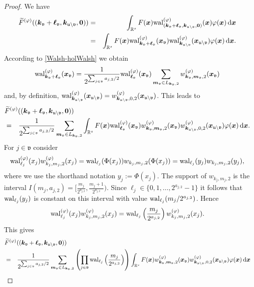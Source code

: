 \documentclass[namedate,webpdf,imanum]{ima-authoring-arxiv}%
\theoremstyle{thmstyletwo}%
\numberwithin{equation}{section}
\newcommand{\rd}{\, {\rm d}}
\newcommand{\wal}{{\rm wal}}
\newcommand{\bsx}{\boldsymbol{x}}
\newcommand{\bsk}{\boldsymbol{k}}
\newcommand{\bsm}{\boldsymbol{m}}
\newcommand{\bsell}{\boldsymbol{\ell}}
\newcommand{\bszero}{\boldsymbol{0}}
\newcommand{\uu}{\mathfrak{u}}
\newcommand{\vv}{\mathfrak{v}}
\newcommand{\RR}{\mathbb{R}}
\begin{document}
\begin{proof}
We have 
\begin{eqnarray*}
\widetilde{F}^{(\varphi)}((\bsk_\vv+\bsell_\vv,\bsk_{\uu \setminus \vv},\bszero))  & = & \int_{\RR^s} F(\bsx) \wal_{(\bsk_\vv+\bsell_\vv,\bsk_{\uu \setminus \vv},\bszero)}^{(\varphi)}(\bsx) \varphi(\bsx) \rd \bsx  \\
& = & \int_{\RR^s} F(\bsx) \wal_{\bsk_\vv+\bsell_\vv}^{(\varphi)}(\bsx_\vv) \wal_{\bsk_{\uu \setminus \vv}}^{(\varphi)}(\bsx_{\uu \setminus \vv}) \varphi(\bsx) \rd \bsx. 
\end{eqnarray*}
According to \eqref{Walsh-holWalsh} we obtain $$\wal_{\bsk_\vv+\bsell_\vv}^{(\varphi)}(\bsx_\vv) = \frac{1}{2^{\sum_{j \in \vv} a_{j,2}/2}} \wal_{\bsell_{\vv}}^{(\varphi)}(\bsx_\vv) \sum_{\bsm_{\vv} \in L_{\bsk_{\vv}, 2}} w_{\bsk_\vv,\bsm_\vv,2}^{(\varphi)}(\bsx_\vv)$$
and, by definition, $\wal_{\bsk_{\uu \setminus \vv}}^{(\varphi)}(\bsx_{\uu \setminus \vv})=w^{(\varphi)}_{\bsk_{\uu \setminus \vv},0,2}(\bsx_{\uu \setminus \vv})$. 
This leads to
\begin{eqnarray*}
\lefteqn{\widetilde{F}^{(\varphi)}((\bsk_\vv+\bsell_\vv,\bsk_{\uu \setminus \vv},\bszero))}\\
& = & \frac{1}{2^{\sum_{j \in \vv} a_{j,2}/2}}  \sum_{\bsm_{\vv} \in L_{\bsk_{\vv}, 2}} \int_{\RR^s} F(\bsx) \wal_{\bsell_{\vv}}^{(\varphi)}(\bsx_\vv) w_{\bsk_\vv,\bsm_\vv,2}^{(\varphi)}(\bsx_\vv) w^{(\varphi)}_{\bsk_{\uu \setminus \vv},0,2}(\bsx_{\uu \setminus \vv}) \varphi(\bsx) \rd \bsx.     
\end{eqnarray*}
For $j \in \vv$ consider
$$\wal_{\ell_j}^{(\varphi)}(x_j) w_{k_j,m_j,2}^{(\varphi)}(x_j) = \wal_{\ell_j}(\Phi(x_j)) w_{k_j,m_j,2}(\Phi(x_j)) = \wal_{\ell_j}(y_j) w_{k_j,m_j,2}(y_j),$$ where we use the shorthand notation $y_j:=\Phi(x_j)$. The support of $w_{k_j,m_j,2}$ is the interval $I(m_j,a_{j,2})=[\frac{m_j}{2^{a_{j,2}}},\frac{m_j+1}{2^{a_{j,2}}})$. Since $\ell_j \in \{0,1,\ldots,2^{a_{j,2}}-1\}$ it follows that $\wal_{\ell_j}(y_j)$ is constant on this interval with value $\wal_{\ell_j}(m_j/2^{a_{j,2}})$. Hence $$\wal_{\ell_j}^{(\varphi)}(x_j) w_{k_j,m_j,2}^{(\varphi)}(x_j) = \wal_{\ell_j}\left(\frac{m_j}{2^{a_{j,2}}}\right)  w_{k_j,m_j,2}^{(\varphi)}(x_j).$$ This gives
\begin{eqnarray*}
\lefteqn{\widetilde{F}^{(\varphi)}((\bsk_\vv+\bsell_\vv,\bsk_{\uu \setminus \vv},\bszero))}\\
& = & \frac{1}{2^{\sum_{j \in \vv} a_{j,2}/2}}  \sum_{\bsm_{\vv} \in L_{\bsk_{\vv}, 2}} \left(\prod_{j \in \vv}\wal_{\ell_j}\left(\frac{m_j}{2^{a_{j,2}}}\right)\right) \int_{\RR^s} F(\bsx) w_{\bsk_\vv,\bsm_\vv,2}^{(\varphi)}(\bsx_\vv) w^{(\varphi)}_{\bsk_{\uu \setminus \vv},0,2}(\bsx_{\uu \setminus \vv}) \varphi(\bsx) \rd \bsx \\

\end{eqnarray*}
\end{proof}
\end{document}
